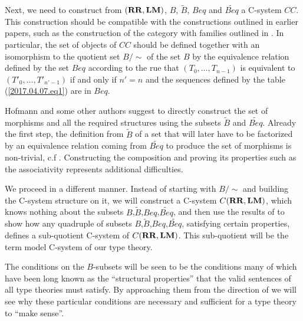 \documentclass[12pt]{amsart}
\newcommand{\wt}{\widetilde}
\newcommand{\RR}{{\bf RR}}
\newcommand{\LM}{{\bf LM}}
\begin{document}

Next, we need to construct from $(\RR,\LM)$, $B$, $\wt{B}$, $Beq$ and $\wt{Beq}$ a C-system $CC$. This construction should be compatible with the constructions outlined in earlier papers, such as the construction of the category with families outlined in \cite{Hofmann}. In particular, the set of objects of $CC$ should be defined together with an isomorphism to the quotient set $B/\sim$ of the set $B$ by the equivalence relation defined by the set $Beq$ according to the rue  that $(T_0,\dots,T_{n-1})$ is equivalent to $(T'_0,\dots,T'_{n'-1})$ if and only if $n'=n$ and the sequences defined by the table (\ref{2017.04.07.eq1}) are in $Beq$. 

Hofmann and some other authors suggest to directly construct the set of morphisms and all the required structures using the subsets $\wt{B}$ and $\wt{Beq}$. Already the first step, the definition from $\wt{B}$ of a set that will later have to be factorized by an equivalence relation coming from $\wt{Beq}$ to produce the set of morphisms is non-trivial, c.f \cite[Def. 2.11, p.97]{Hofmann}. Constructing the composition and proving its properties such as the associativity represents additional difficulties.

We proceed in a different manner. Instead of starting with $B/\sim$ and building the C-system structure on it, we will construct a C-system $C(\RR,\LM)$, which knows nothing about the subsets $B$,$\wt{B}$,$Beq$,$\wt{Beq}$, and then use the results of \cite{Csubsystems} to show how any quadruple of subsets $B$,$\wt{B}$,$Beq$,$\wt{Beq}$, satisfying certain properties, defines a sub-quotient C-system of $C(\RR,\LM)$. This sub-quotient will be the term model C-system of our type theory. 

The conditions on the $B$-subsets will be seen to be the conditions many of which have been long known as the ``structural properties'' that the valid sentences of all type theories must satisfy. By approaching them from the direction of \cite{Csubsystems} we will see why these particular conditions are necessary and sufficient for a type theory to ``make sense''. 
\end{document}
